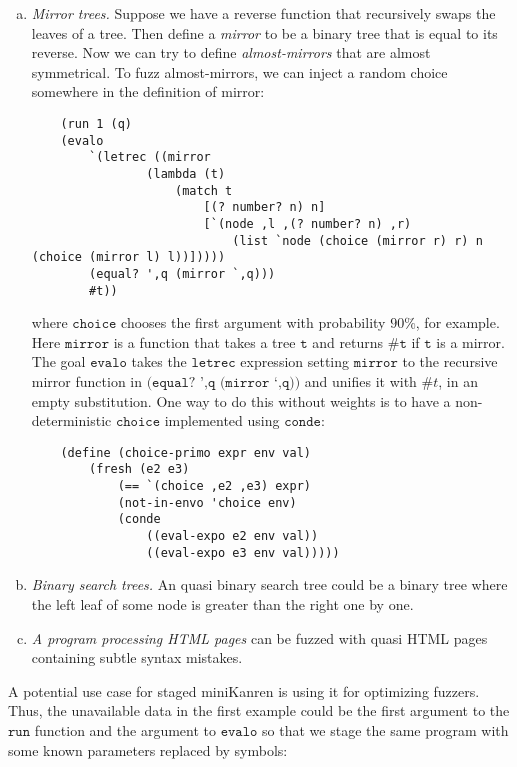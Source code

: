 \documentclass[11pt]{article}
\theoremstyle{definition}
\newcommand{\code}[1]{\texttt{#1}}
\newcommand\tab[1][1cm]{\hspace*{#1}}
\begin{document}
\begin{enumerate}[(a)]
    \item \textit{Mirror trees.} Suppose we have a reverse function that recursively swaps the leaves of a tree. Then define a \textit{mirror} to be a binary tree that is equal to its reverse. Now we can try to define \textit{almost-mirrors} that are almost symmetrical. To fuzz almost-mirrors, we can inject a random choice somewhere in the definition of mirror:
    \begin{lstlisting}
    (run 1 (q) 
    (evalo 
        `(letrec ((mirror 
                (lambda (t)
                    (match t 
                        [(? number? n) n]
                        [`(node ,l ,(? number? n) ,r)
                            (list `node (choice (mirror r) r) n (choice (mirror l) l))]))))
        (equal? ',q (mirror `,q)))
        #t))
    \end{lstlisting}
    where $\code{choice}$ chooses the first argument with probability $90 \%$, for example. Here $\code{mirror}$ is a function that takes a tree $\code{t}$ and returns $\mathtt{\#t}$ if $\code{t}$ is a mirror. The goal $\code{evalo}$ takes the $\code{letrec}$ expression setting $\code{mirror}$ to the recursive mirror function in $\code{(equal? ',q (mirror `,q))}$ and unifies it with $\# t$, in an empty substitution.\newline 
    \tab One way to do this without weights is to have a non-deterministic $\code{choice}$ implemented using $\code{conde}$:
    \begin{lstlisting}
    (define (choice-primo expr env val)
        (fresh (e2 e3)
            (== `(choice ,e2 ,e3) expr)
            (not-in-envo 'choice env)
            (conde
                ((eval-expo e2 env val))
                ((eval-expo e3 env val)))))
    \end{lstlisting}

    \item \textit{Binary search trees.} An quasi binary search tree could be a binary tree where the left leaf of some node is greater than the right one by one. 
    \item \textit{A program processing HTML pages} can be fuzzed with quasi HTML pages containing subtle syntax mistakes.
\end{enumerate}
\tab A potential use case for staged miniKanren is using it for optimizing fuzzers. Thus, the unavailable data in the first example could be the first argument to the $\code{run}$ function and the argument to $\code{evalo}$ so that we stage the same program with some known parameters replaced by symbols:
\end{document}
